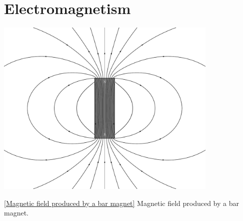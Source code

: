 \documentclass[oneside]{book}
\begin{document}
\chapter{Electromagnetism}
\begin{center}
    \includegraphics[width=0.8\textwidth]{../images/Bar-Magnet/Bar-Magnet.pdf}
    \captionsetup{type=figure}
    \caption[figure]{\ref{Magnetic field produced by a bar magnet} Magnetic field produced by a bar magnet.}
\end{center}
\end{document}
